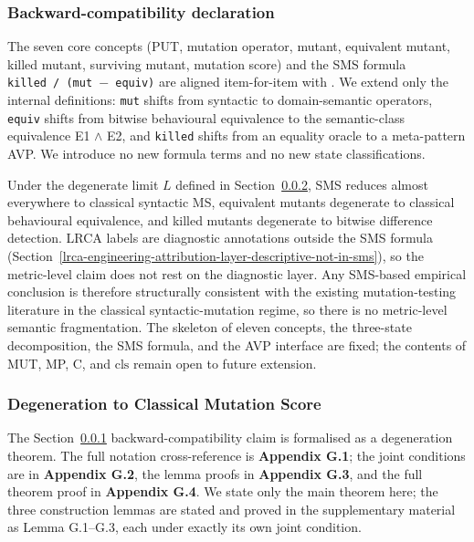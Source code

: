 \documentclass[manuscript,screen,review]{acmart}
\begin{document}
\subsubsection{Backward-compatibility declaration}\label{backward-compatibility-declaration}

The seven core concepts (PUT, mutation operator, mutant, equivalent
mutant, killed mutant, surviving mutant, mutation score) and the SMS
formula
\texttt{\textbar{}killed\textbar{}\ /\ (\textbar{}mut\textbar{}\ $-$\ \textbar{}equiv\textbar{})}
are aligned item-for-item with \citet{jia2011analysis}. We extend only the
internal definitions: \texttt{mut} shifts from syntactic to
domain-semantic operators, \texttt{equiv} shifts from bitwise
behavioural equivalence to the semantic-class equivalence E1 $\wedge$ E2, and
\texttt{killed} shifts from an equality oracle to a meta-pattern AVP. We
introduce no new formula terms and no new state classifications.

Under the degenerate limit $L$ defined in Section~\ref{sms-ms-degeneration-formal-statement}, SMS reduces
almost everywhere to classical syntactic MS, equivalent mutants
degenerate to classical behavioural equivalence, and killed mutants
degenerate to bitwise difference detection. LRCA labels are diagnostic
annotations outside the SMS formula
(Section~\ref{lrca-engineering-attribution-layer-descriptive-not-in-sms}),
so the metric-level claim does not rest on the diagnostic layer. Any
SMS-based empirical conclusion is therefore structurally consistent with
the existing mutation-testing literature in the classical
syntactic-mutation regime, so there is no metric-level semantic
fragmentation. The skeleton of eleven concepts, the three-state
decomposition, the SMS formula, and the AVP interface are fixed; the
contents of MUT, MP, C, and $\mathrm{cls}$ remain open to future
extension.

\subsubsection{Degeneration to Classical Mutation Score}\label{sms-ms-degeneration-formal-statement}

The Section~\ref{backward-compatibility-declaration} backward-compatibility claim is formalised as a degeneration
theorem. The full notation cross-reference is \textbf{Appendix G.1}; the joint
conditions are in \textbf{Appendix G.2}, the lemma proofs in
\textbf{Appendix G.3}, and the full theorem proof in \textbf{Appendix G.4}. We
state only the main theorem here; the three construction
lemmas are stated and proved in the supplementary material as
Lemma G.1--G.3, each under exactly its own joint condition.
\end{document}
